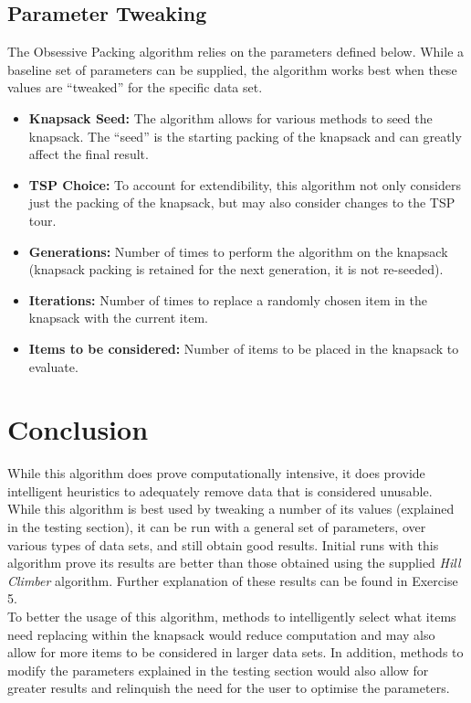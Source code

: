 \documentclass[a4paper,12pt]{article}
\begin{document}
\subsection{Parameter Tweaking}
The Obsessive Packing algorithm relies on the parameters defined below. While a baseline set of parameters can be supplied, the algorithm works best when these values are ``tweaked'' for the specific data set.
\begin{itemize}
	\item {\bf Knapsack Seed:} The algorithm allows for various methods to seed the knapsack. The ``seed'' is the starting packing of the knapsack and can greatly affect the final result.
	\item {\bf TSP Choice:} To account for extendibility, this algorithm not only considers just the packing of the knapsack, but may also consider changes to the TSP tour.
	\item {\bf Generations:} Number of times to perform the algorithm on the knapsack (knapsack packing is retained for the next generation, it is not re-seeded).
	\item {\bf Iterations:} Number of times to replace a randomly chosen item in the knapsack with the current item.
	\item {\bf Items to be considered:} Number of items to be placed in the knapsack to evaluate.
\end{itemize}

\section{Conclusion}
While this algorithm does prove computationally intensive, it does provide intelligent heuristics to adequately remove data that is considered unusable. While this algorithm is best used by tweaking a number of its values (explained in the testing section), it can be run with a general set of parameters, over various types of data sets, and still obtain good results. Initial runs with this algorithm prove its results are better than those obtained using the supplied \textit{Hill Climber} algorithm. Further explanation of these results can be found in Exercise 5.\\

To better the usage of this algorithm, methods to intelligently select what items need replacing within the knapsack would reduce computation and may also allow for more items to be considered in larger data sets. In addition, methods to modify the parameters explained in the testing section would also allow for greater results and relinquish the need for the user to optimise the parameters.
\end{document}
